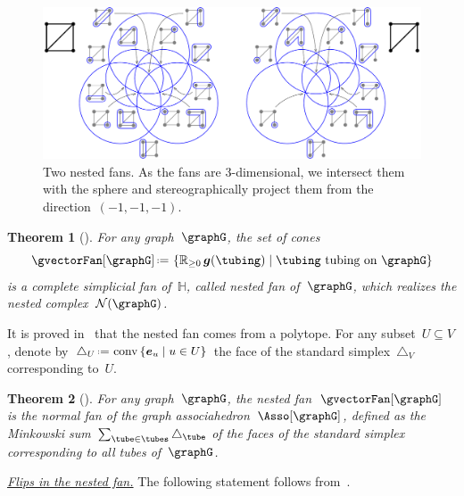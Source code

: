 \documentclass{amsart}
\newtheorem{theorem}{Theorem}[section]
\theoremstyle{definition}
\newcommand{\R}{\mathbb{R}} %
\newcommand{\HH}{\mathbb{H}} %
\renewcommand{\b}[1]{{\boldsymbol{#1}}} %
\newcommand{\set}[2]{\left\{ #1 \;\middle|\; #2 \right\}} %
\newcommand{\eqdef}{\mbox{\,\raisebox{0.2ex}{\scriptsize\ensuremath{\mathrm:}}\ensuremath{=}\,}} %
\DeclareMathOperator{\conv}{conv} %
\newcommand{\darkblue}{\color{darkblue}} %
\newcommand{\defn}[1]{\textsl{\darkblue #1}} %
\newcommand{\para}[1]{\medskip\noindent\uline{\textit{#1.}}} %
\newcommand{\gvectors}[1]{\b{g}(#1)} %
\newcommand{\ground}{V} %
\newcommand{\nestedComplex}{\mathcal{N}} %
\begin{document}
\begin{figure}[t]
	\capstart
	\centerline{\includegraphics[scale=.55]{nestedFans}}
	\caption{Two nested fans. As the fans are $3$-dimensional, we intersect them with the sphere and stereographically project them from the direction~$(-1,-1,-1)$.}
	\label{fig:nestedFans}
\end{figure}

\begin{theorem}[\cite{CarrDevadoss, Postnikov, FeichtnerSturmfels, Zelevinsky}]
\label{thm:nestedFan}
For any graph~$\graphG$, the set of cones
\[
\gvectorFan[\graphG] \eqdef \set{\R_{\ge 0} \, \gvectors{\tubing}}{\tubing \text{ tubing on } \graphG}
\]
is a complete simplicial fan of~$\HH$, called \defn{nested fan} of~$\graphG$, which realizes the nested complex~$\nestedComplex(\graphG)$.
\end{theorem}

It is proved in~\cite{CarrDevadoss, Devadoss, Postnikov, FeichtnerSturmfels, Zelevinsky} that the nested fan comes from a polytope.
For any subset~$U \subseteq \ground$, denote by~$\triangle_U \eqdef \conv\set{\b{e}_u}{u \in U}$ the face of the standard simplex~$\triangle_\ground$ corresponding to~$U$.

\begin{theorem}[\cite{CarrDevadoss, Devadoss, Postnikov, FeichtnerSturmfels, Zelevinsky}]
For any graph~$\graphG$, the nested fan~$\gvectorFan[\graphG]$ is the normal fan of the graph associahedron~$\Asso[\graphG]$, defined as the Minkowski sum~$\sum_{\tube \in \tubes} \triangle_{\tube}$ of the faces of the standard simplex corresponding to all tubes of~$\graphG$.
\end{theorem}

\para{Flips in the nested fan}
%
The following statement follows from~\cite{MannevillePilaud-compatibilityFans, Zelevinsky}.
\end{document}
